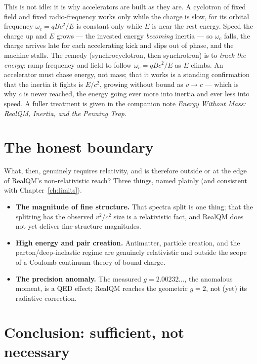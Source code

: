 This is not idle: it is why accelerators are built as they are. A cyclotron of fixed field and fixed
radio-frequency works only while the charge is slow, for its orbital frequency $\omega_c=qBc^2/E$ is constant only
while $E$ is near the rest energy. Speed the charge up and $E$ grows --- the invested energy \emph{becoming}
inertia --- so $\omega_c$ falls, the charge arrives late for each accelerating kick and slips out of phase, and the
machine stalls. The remedy (synchrocyclotron, then synchrotron) is to \emph{track the energy}: ramp frequency and
field to follow $\omega_c=qBc^2/E$ as $E$ climbs. An accelerator must chase energy, not mass; that it works is a
standing confirmation that the inertia it fights is $E/c^2$, growing without bound as $v\to c$ --- which is why $c$
is never reached, the energy going ever more into inertia and ever less into speed. A fuller treatment is given in
the companion note \emph{Energy Without Mass: RealQM, Inertia, and the Penning Trap}.

\section{The honest boundary}\label{sec:rel-boundary}

What, then, genuinely requires relativity, and is therefore outside or at the edge of RealQM's non-relativistic
reach? Three things, named plainly (and consistent with Chapter~\ref{ch:limits}).
\begin{itemize}
\item \textbf{The magnitude of fine structure.} That spectra split is one thing; that the splitting has the
observed $v^2/c^2$ size is a relativistic fact, and RealQM does not yet deliver fine-structure magnitudes.
\item \textbf{High energy and pair creation.} Antimatter, particle creation, and the parton/deep-inelastic regime
are genuinely relativistic and outside the scope of a Coulomb continuum theory of bound charge.
\item \textbf{The precision anomaly.} The measured $g=2.00232\ldots$, the anomalous moment, is a QED effect; RealQM
reaches the geometric $g=2$, not (yet) its radiative correction.
\end{itemize}

\section{Conclusion: sufficient, not necessary}\label{sec:rel-conclusion}

